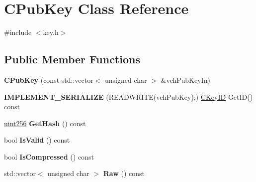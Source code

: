 \hypertarget{class_c_pub_key}{}\section{C\+Pub\+Key Class Reference}
\label{class_c_pub_key}


{\ttfamily \#include $<$key.\+h$>$}

\subsection*{Public Member Functions}
\begin{DoxyCompactItemize}
\item 
\mbox{\label{class_c_pub_key_a9ad2855d2141555616817e014a64d8d2}} 
{\bfseries C\+Pub\+Key} (const std\+::vector$<$ unsigned char $>$ \&vch\+Pub\+Key\+In)
\item 
\mbox{\label{class_c_pub_key_a5bec731f1af1bf360242320e4ec9b4ca}} 
{\bfseries I\+M\+P\+L\+E\+M\+E\+N\+T\+\_\+\+S\+E\+R\+I\+A\+L\+I\+ZE} (R\+E\+A\+D\+W\+R\+I\+TE(vch\+Pub\+Key);) \mbox{\hyperlink{class_c_key_i_d}{C\+Key\+ID}} Get\+ID() const
\item 
\mbox{\label{class_c_pub_key_ab1aaa3f6085a3e9bc034d3e1269d870d}} 
\mbox{\hyperlink{classuint256}{uint256}} {\bfseries Get\+Hash} () const
\item 
\mbox{\label{class_c_pub_key_a4fa94293cf8577fd039b9a133f6c7f30}} 
bool {\bfseries Is\+Valid} () const
\item 
\mbox{\label{class_c_pub_key_a25f8b70340ad20ddab0f80ec4cee9396}} 
bool {\bfseries Is\+Compressed} () const
\item 
\mbox{\label{class_c_pub_key_a0901f7361c4e539dd6d35c79d0db3f89}} 
std\+::vector$<$ unsigned char $>$ {\bfseries Raw} () const
\end{DoxyCompactItemize}
